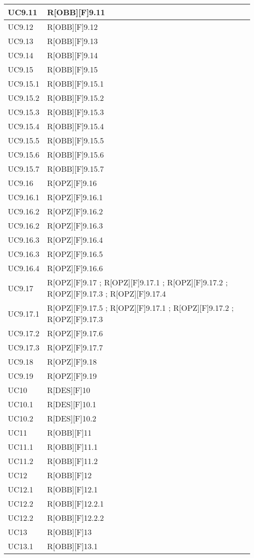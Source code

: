 	\begin{table}[H]
		\centering
		\begin{tabular}{|p{}|p{}|}
			\midrule

			UC9.11 & R[OBB][F]9.11 \\ \midrule
			UC9.12 & R[OBB][F]9.12 \\ \midrule
			UC9.13 & R[OBB][F]9.13 \\ \midrule
			UC9.14 & R[OBB][F]9.14 \\ \midrule
			UC9.15 & R[OBB][F]9.15 \\ \midrule
			UC9.15.1 & R[OBB][F]9.15.1 \\ \midrule
			UC9.15.2 & R[OBB][F]9.15.2 \\ \midrule
			UC9.15.3 & R[OBB][F]9.15.3 \\ \midrule
			UC9.15.4 & R[OBB][F]9.15.4 \\ \midrule
			UC9.15.5 & R[OBB][F]9.15.5 \\ \midrule
			UC9.15.6 & R[OBB][F]9.15.6 \\ \midrule
			UC9.15.7 & R[OBB][F]9.15.7 \\ \midrule
			UC9.16 & R[OPZ][F]9.16 \\ \midrule
			UC9.16.1 & R[OPZ][F]9.16.1 \\ \midrule
			UC9.16.2 & R[OPZ][F]9.16.2 \\ \midrule
			UC9.16.2 & R[OPZ][F]9.16.3 \\ \midrule
			UC9.16.3 & R[OPZ][F]9.16.4 \\ \midrule
			UC9.16.3 & R[OPZ][F]9.16.5 \\ \midrule
			UC9.16.4 & R[OPZ][F]9.16.6 \\ \midrule
			UC9.17 & R[OPZ][F]9.17 ; R[OPZ][F]9.17.1 ; R[OPZ][F]9.17.2 ; R[OPZ][F]9.17.3 ; R[OPZ][F]9.17.4 \\ \midrule
			UC9.17.1 & R[OPZ][F]9.17.5 ; R[OPZ][F]9.17.1 ; R[OPZ][F]9.17.2 ; R[OPZ][F]9.17.3 \\ \midrule
			UC9.17.2 & R[OPZ][F]9.17.6 \\ \midrule
			UC9.17.3 & R[OPZ][F]9.17.7 \\ \midrule
			UC9.18 & R[OPZ][F]9.18 \\ \midrule
			UC9.19 & R[OPZ][F]9.19 \\ \midrule
			UC10 & R[DES][F]10 \\ \midrule			
			UC10.1 & R[DES][F]10.1 \\ \midrule
			UC10.2 & R[DES][F]10.2 \\ \midrule
			UC11 & R[OBB][F]11 \\ \midrule
			UC11.1 & R[OBB][F]11.1 \\ \midrule
			UC11.2 & R[OBB][F]11.2 \\ \midrule
			UC12 & R[OBB][F]12 \\ \midrule
			UC12.1 & R[OBB][F]12.1 \\ \midrule
			UC12.2 & R[OBB][F]12.2.1 \\ \midrule
			UC12.2 & R[OBB][F]12.2.2 \\ \midrule
			UC13 & R[OBB][F]13 \\ \midrule
			UC13.1 & R[OBB][F]13.1 \\
			

\end{tabular}
\end{table}
